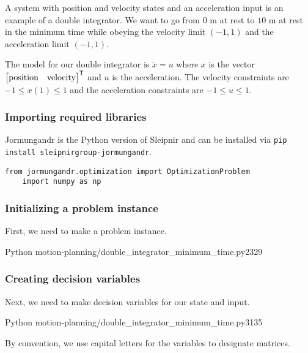 A system with position and velocity states and an acceleration input is an
example of a double integrator. We want to go from $0$ m at rest to $10$ m at
rest in the minimum time while obeying the velocity limit $(-1, 1)$ and the
acceleration limit $(-1, 1)$.

The model for our double integrator is $\ddot{x} = u$ where $x$ is the vector
$\begin{bmatrix}\text{position} & \text{velocity}\end{bmatrix}^\mathsf{T}$ and $u$ is the
acceleration. The velocity constraints are $-1 \leq x(1) \leq 1$ and the
acceleration constraints are $-1 \leq u \leq 1$.

\subsubsection{Importing required libraries}

Jormungandr is the Python version of Sleipnir and can be installed via
\texttt{pip install sleipnirgroup-jormungandr}.
\begin{code}
  \begin{lstlisting}[style=customPython]
    from jormungandr.optimization import OptimizationProblem
    import numpy as np
  \end{lstlisting}
\end{code}

\subsubsection{Initializing a problem instance}

First, we need to make a problem instance.
\begin{coderemotesubset}{Python}
  {motion-planning/double_integrator_minimum_time.py}{23}{29}
\end{coderemotesubset}

\subsubsection{Creating decision variables}

Next, we need to make decision variables for our state and input.
\begin{coderemotesubset}{Python}
  {motion-planning/double_integrator_minimum_time.py}{31}{35}
\end{coderemotesubset}

By convention, we use capital letters for the variables to designate
matrices.


